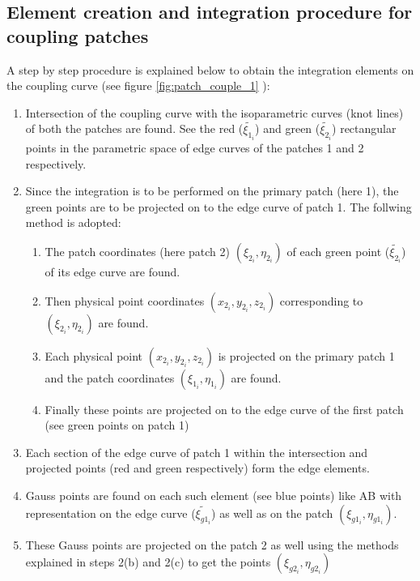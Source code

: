 \documentclass[12pt, a4paper]{report}
\begin{document}
\subsection{Element creation and integration procedure for coupling patches}

A step by step procedure is explained below to obtain the integration elements on the coupling curve (see figure \ref{fig:patch_couple_1} ):

\begin{enumerate}
    \item Intersection of the coupling curve with the isoparametric curves (knot lines) of both the patches are found. See the red ($\tilde{\xi_{1_i}}$) and green ($\tilde{\xi_{2_i}}$) rectangular points in the parametric space of edge curves of the patches 1 and 2 respectively.
    \item Since the integration is to be performed on the primary patch (here 1), the green points are to be projected on to the edge curve of patch 1. The follwing method is adopted:
    \begin{enumerate}
        \item The patch coordinates (here patch 2) $(\xi_{2_i},\eta_{2_i})$ of each green point ($\tilde{\xi_{2_i}}$) of its edge curve are found.
        \item Then physical point coordinates $(x_{2_i},y_{2_i},z_{2_i})$ corresponding to $(\xi_{2_i},\eta_{2_i})$ are found.
        \item Each physical point $(x_{2_i},y_{2_i},z_{2_i})$ is projected on the primary patch 1 and the patch coordinates $(\xi_{1_i},\eta_{1_i})$ are found.
        \item Finally these points are projected on to the edge curve of the first patch (see green points on patch 1)
    \end{enumerate}
    \item Each section of the edge curve of patch 1 within the intersection and projected points (red and green respectively) form the edge elements.
    \item Gauss points are found on each such element (see blue points) like AB with representation on the edge curve ($\tilde{\xi_{g1_i}}$) as well as on the patch $(\xi_{g1_i},\eta_{g1_i})$.
    \item These Gauss points are projected on the patch 2 as well using the methods explained in steps 2(b) and 2(c) to get the points $(\xi_{g2_i},\eta_{g2_i})$
\end{enumerate}
\end{document}
